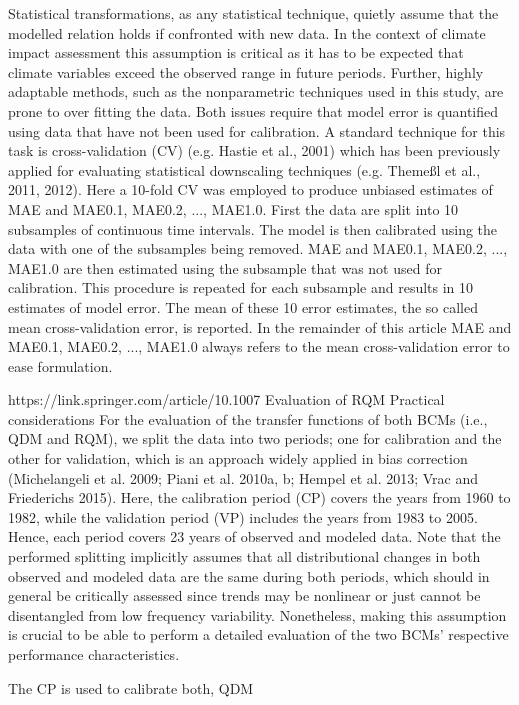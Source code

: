 \documentclass[hess, manuscript]{copernicus}
\begin{document}
Statistical transformations, as any statistical technique,
quietly assume that the modelled relation holds if confronted
with new data. In the context of climate impact assessment
this assumption is critical as it has to be expected that climate variables exceed the observed range in future periods.
Further, highly adaptable methods, such as the nonparametric techniques used in this study, are prone to over fitting the
data. Both issues require that model error is quantified using
data that have not been used for calibration. A standard technique for this task is cross-validation (CV) (e.g. Hastie et al.,
2001) which has been previously applied for evaluating statistical downscaling techniques (e.g. Themeßl et al., 2011,
2012). Here a 10-fold CV was employed to produce unbiased estimates of MAE and MAE0.1, MAE0.2, ..., MAE1.0.
First the data are split into 10 subsamples of continuous time
intervals. The model is then calibrated using the data with
one of the subsamples being removed. MAE and MAE0.1,
MAE0.2, ..., MAE1.0 are then estimated using the subsample
that was not used for calibration. This procedure is repeated
for each subsample and results in 10 estimates of model error. The mean of these 10 error estimates, the so called mean
cross-validation error, is reported. In the remainder of this article MAE and MAE0.1, MAE0.2, ..., MAE1.0 always refers
to the mean cross-validation error to ease formulation.

https://link.springer.com/article/10.1007%
Evaluation of RQM
Practical considerations
For the evaluation of the transfer functions of both BCMs (i.e., QDM and RQM), we split the data into two periods; one for calibration and the other for validation, which is an approach widely applied in bias correction (Michelangeli et al. 2009; Piani et al. 2010a, b; Hempel et al. 2013; Vrac and Friederichs 2015). Here, the calibration period (CP) covers the years from 1960 to 1982, while the validation period (VP) includes the years from 1983 to 2005. Hence, each period covers 23 years of observed and modeled data. Note that the performed splitting implicitly assumes that all distributional changes in both observed and modeled data are the same during both periods, which should in general be critically assessed since trends may be nonlinear or just cannot be disentangled from low frequency variability. Nonetheless, making this assumption is crucial to be able to perform a detailed evaluation of the two BCMs’ respective performance characteristics.

The CP is used to calibrate both, QDM 
\end{document}
